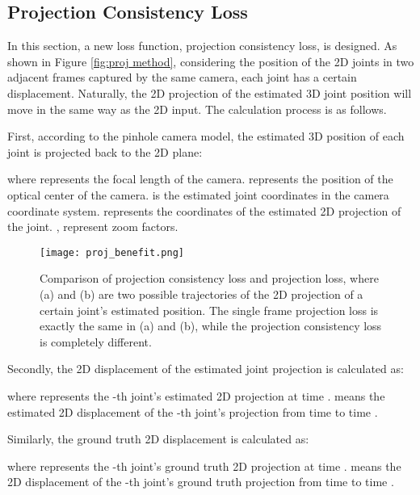 \documentclass[journal]{IEEEtran}
\begin{document}
\subsection{Projection Consistency Loss}
\label{subsection:3.3}

In this section, a new loss function, projection consistency loss, is designed. As shown in Figure \ref{fig:proj method}, considering the position of the 2D joints in two adjacent frames captured by the same camera, each joint has a certain displacement. Naturally, the 2D projection of the estimated 3D joint position will move in the same way as the 2D input. The calculation process is as follows.

First, according to the pinhole camera model, the estimated 3D position of each joint is projected back to the 2D plane:

where  represents the focal length of the camera.  represents the position of the optical center of the camera.  is the estimated joint coordinates in the camera coordinate system.  represents the coordinates of the estimated 2D projection of the joint. ,  represent zoom factors.

\begin{figure}[t]
	\centering
	\texttt{[image: proj\_benefit.png]}
	\vspace{-0pt}
	\caption{Comparison of projection consistency loss and projection loss, where (a) and (b) are two possible trajectories of the 2D projection of a certain joint's estimated position. The single frame projection loss is exactly the same in (a) and (b), while the projection consistency loss is completely different.} 
	\label{fig:proj benefit}
	\vspace{-0pt}
\end{figure}

Secondly, the 2D displacement of the estimated joint projection is calculated as:

where  represents the -th joint's estimated 2D projection at time .  means the estimated 2D displacement of the -th joint's projection from time  to time .\par 
Similarly, the ground truth 2D displacement is calculated as:

where  represents the -th joint's ground truth 2D projection at time .  means the 2D displacement of the -th joint's ground truth projection from time  to time .
\end{document}
